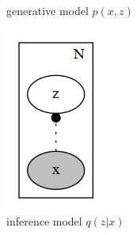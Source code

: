 \documentclass[final]{beamer}
\begin{document}
\begin{frame}
\begin{figure}[h]
\begin{subfigure}[b]{0.2\textwidth}
\caption{generative model $p(x,z)$}
\end{subfigure}
\begin{subfigure}[b]{0.2\textwidth}
\includegraphics[width=\textwidth]{plots/vae_q.gv.png}
\caption{inference model $q(z|x)$}
\end{subfigure}
\begin{subfigure}[b]{0.2\textwidth}

\end{subfigure}
\end{figure}
\end{frame}
\end{document}
